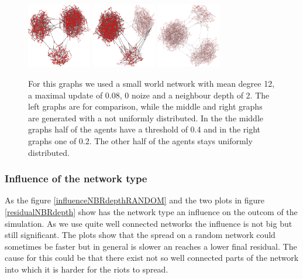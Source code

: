 \begin{figure}
\includegraphics[width=0.25\textwidth]{batchRun__kHalf=2-2-2_maxUpdate=0.08_noize=0_nbrDepth=2/network1000-crop.pdf}
\hfill
\includegraphics[width=0.25\textwidth]{batchRun__kHalf=2-2-2_maxUpdate=0.08_noize=0_nbrDepth=2_fixedthreshold=0.4/network1000-crop.pdf}
\hfill
\includegraphics[width=0.25\textwidth]{batchRun__kHalf=2-2-2_maxUpdate=0.08_noize=0_nbrDepth=2_fixedthreshold=0.2/network1000-crop.pdf}

\caption{For this graphs we used a small world network with mean degree 12, a maximal update of 0.08, 0 noize and a neighbour depth of 2. The left graphs are for comparison, while the middle and right graphs are generated with a not uniformly distributed. In the the middle graphs half of the agents have a threshold of 0.4 and in the right graphs one of 0.2. The other half of the agents stays uniformly distributed.}
\label{influencenthresholdnetwork}
\end{figure}

\subsubsection{Influence of the network type}
\label{sec:influencenetworktype}
As the figure \ref{influenceNBRdepthRANDOM} and the two plots in figure \ref{residualNBRdepth} show has the network type an influence on the outcom of the simulation. As we use quite well connected networks the influence is not big but still significant. The plots show that the spread on a random network could sometimes be faster but in general is slower an reaches a lower final residual. The cause for this could be that there exist not so well connected parts of the network into which it is harder for the riots to spread.

